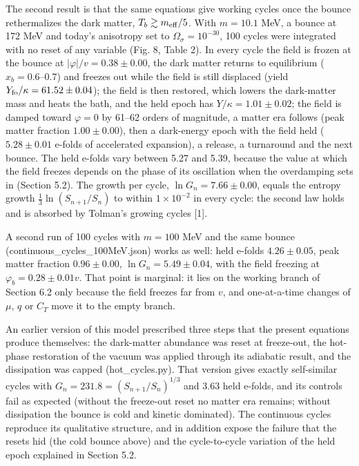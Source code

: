 \documentclass[11pt,a4paper]{article}
\begin{document}
The second result is that the same equations give working cycles once the bounce rethermalizes the dark matter, $T_b\gtrsim m_{\rm eff}/5$. With $m=10.1$ MeV, a bounce at 172 MeV and today's anisotropy set to $\Omega_\sigma=10^{-30}$, 100 cycles were integrated with no reset of any variable (Fig. 8, Table 2). In every cycle the field is frozen at the bounce at $|\varphi|/v=0.38\pm0.00$, the dark matter returns to equilibrium ($x_b=0.6$--$0.7$) and freezes out while the field is still displaced (yield $Y_{\rm fo}/\kappa=61.52\pm0.04$); the field is then restored, which lowers the dark-matter mass and heats the bath, and the held epoch has $Y/\kappa=1.01\pm0.02$; the field is damped toward $\varphi=0$ by 61--62 orders of magnitude, a matter era follows (peak matter fraction $1.00\pm0.00$), then a dark-energy epoch with the field held ($5.28\pm0.01$ e-folds of accelerated expansion), a release, a turnaround and the next bounce. The held e-folds vary between 5.27 and 5.39, because the value at which the field freezes depends on the phase of its oscillation when the overdamping sets in (Section 5.2). The growth per cycle, $\ln G_n=7.66\pm0.00$, equals the entropy growth $\frac{1}{3}\ln(S_{n+1}/S_n)$ to within $1\times10^{-2}$ in every cycle: the second law holds and is absorbed by Tolman's growing cycles [1].

A second run of 100 cycles with $m=100$ MeV and the same bounce (continuous\_cycles\_100MeV.json) works as well: held e-folds $4.26\pm0.05$, peak matter fraction $0.96\pm0.00$, $\ln G_n=5.49\pm0.04$, with the field freezing at $\varphi_b=0.28\pm0.01v$. That point is marginal: it lies on the working branch of Section 6.2 only because the field freezes far from $v$, and one-at-a-time changes of $\mu$, $q$ or $C_T$ move it to the empty branch.

An earlier version of this model prescribed three steps that the present equations produce themselves: the dark-matter abundance was reset at freeze-out, the hot-phase restoration of the vacuum was applied through its adiabatic result, and the dissipation was capped (hot\_cycles.py). That version gives exactly self-similar cycles with $G_n=231.8=(S_{n+1}/S_n)^{1/3}$ and 3.63 held e-folds, and its controls fail as expected (without the freeze-out reset no matter era remains; without dissipation the bounce is cold and kinetic dominated). The continuous cycles reproduce its qualitative structure, and in addition expose the failure that the resets hid (the cold bounce above) and the cycle-to-cycle variation of the held epoch explained in Section 5.2.
\end{document}
